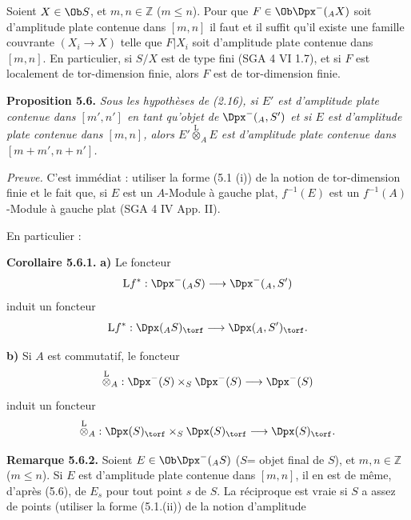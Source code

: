 Soient \(X\in\Ob S\), et \(m,n\in\mathbb Z\) (\(m\leq n\)). Pour que \(F\in\Ob\Dpx^-({}_A X)\) soit d'amplitude plate contenue dans \([m,n]\) il faut et il suffit qu'il existe une famille couvrante \((X_i\to X)\) telle que \(F|X_i\) soit d'amplitude plate contenue dans \([m,n]\). En particulier, si \(S/X\) est de type fini (SGA 4 VI 1.7), et si \(F\) est localement de tor-dimension finie, alors \(F\) est de tor-dimension finie.

\textbf{Proposition 5.6.} \emph{Sous les hypothèses de (2.16), si \(E'\) est d'amplitude plate contenue dans \([m',n']\) en tant qu'objet de \(\Dpx^-({}_A, S')\) et si \(E\) est d'amplitude plate contenue dans \([m,n]\), alors \(E'\overset{\mathrm L}{\otimes}_A E\) est d'amplitude plate contenue dans \([m+m',n+n']\).}

\emph{Preuve.} C'est immédiat : utiliser la forme (5.1 (i)) de la notion de tor-dimension finie et le fait que, si \(E\) est un \(A\)-Module à gauche plat, \(f^{-1}(E)\) est un \(f^{-1}(A)\)-Module à gauche plat (SGA 4 IV App. II).

En particulier :

\textbf{Corollaire 5.6.1.} \textbf{a)} Le foncteur
\[
  \mathrm L f^*:\Dpx^-({}_A S)\longrightarrow \Dpx^-({}_A, S')
\]
induit un foncteur
\[
  \mathrm L f^*:\Dpx({}_A S)_{\torf}\longrightarrow \Dpx({}_A, S')_{\torf}.
\]

\textbf{b)} Si \(A\) est commutatif, le foncteur
\[
  \overset{\mathrm L}{\otimes}_A:
  \Dpx^-(S)\times_S\Dpx^-(S)
  \longrightarrow \Dpx^-(S)
\]
induit un foncteur
\[
  \overset{\mathrm L}{\otimes}_A:
  \Dpx(S)_{\torf}\times_S\Dpx(S)_{\torf}
  \longrightarrow \Dpx(S)_{\torf}.
\]

\textbf{Remarque 5.6.2.} Soient \(E\in\Ob\Dpx^-({}_A S)\) (\(S\)= objet final de \(S\)), et \(m,n\in\mathbb Z\) (\(m\leq n\)). Si \(E\) est d'amplitude plate contenue dans \([m,n]\), il en est de même, d'après (5.6), de \(E_s\) pour tout point \(s\) de \(S\). La réciproque est vraie si \(S\) a assez de points (utiliser la forme (5.1.(ii)) de la notion d'amplitude
